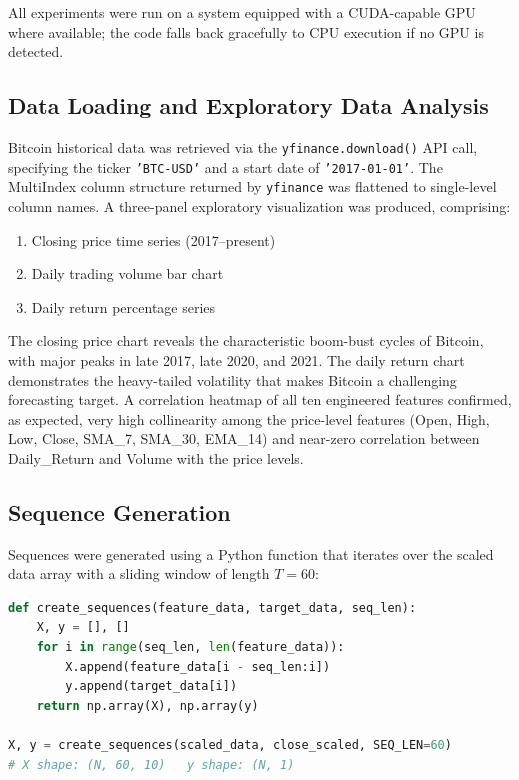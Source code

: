 \documentclass[12pt]{article}
\begin{document}
All experiments were run on a system equipped with a CUDA-capable GPU where available; the code falls back gracefully to CPU execution if no GPU is detected.

\subsection{Data Loading and Exploratory Data Analysis}

Bitcoin historical data was retrieved via the \texttt{yfinance.download()} API call, specifying the ticker \texttt{'BTC-USD'} and a start date of \texttt{'2017-01-01'}. The MultiIndex column structure returned by \texttt{yfinance} was flattened to single-level column names. A three-panel exploratory visualization was produced, comprising:

\begin{enumerate}[leftmargin=*]
    \item Closing price time series (2017--present)
    \item Daily trading volume bar chart
    \item Daily return percentage series
\end{enumerate}

The closing price chart reveals the characteristic boom-bust cycles of Bitcoin, with major peaks in late 2017, late 2020, and 2021. The daily return chart demonstrates the heavy-tailed volatility that makes Bitcoin a challenging forecasting target. A correlation heatmap of all ten engineered features confirmed, as expected, very high collinearity among the price-level features (Open, High, Low, Close, SMA\_7, SMA\_30, EMA\_14) and near-zero correlation between Daily\_Return and Volume with the price levels.

\subsection{Sequence Generation}

Sequences were generated using a Python function that iterates over the scaled data array with a sliding window of length $T = 60$:

\begin{lstlisting}[language=Python, caption=Sliding Window Sequence Construction]
def create_sequences(feature_data, target_data, seq_len):
    X, y = [], []
    for i in range(seq_len, len(feature_data)):
        X.append(feature_data[i - seq_len:i])
        y.append(target_data[i])
    return np.array(X), np.array(y)

X, y = create_sequences(scaled_data, close_scaled, SEQ_LEN=60)
# X shape: (N, 60, 10)   y shape: (N, 1)
\end{lstlisting}
\end{document}
